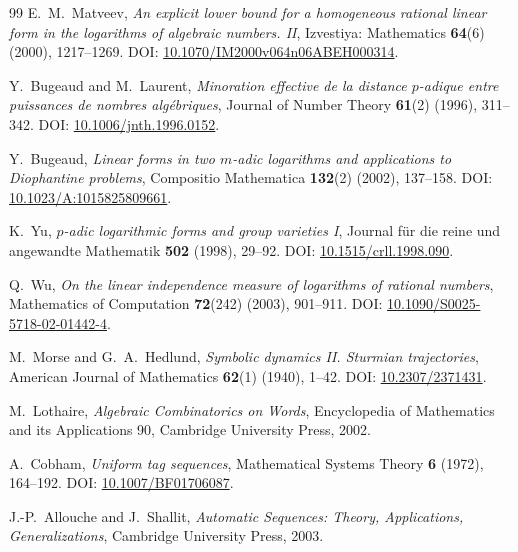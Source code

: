 \documentclass[11pt,oneside]{article}
\theoremstyle{definition}
\theoremstyle{remark}
\begin{document}
\begin{thebibliography}{99}
E.~M.~Matveev,
\newblock \emph{An explicit lower bound for a homogeneous rational linear form in the logarithms of algebraic numbers. II},
\newblock Izvestiya: Mathematics \textbf{64}(6) (2000), 1217--1269.
\newblock DOI: \href{https://doi.org/10.1070/IM2000v064n06ABEH000314}{10.1070/IM2000v064n06ABEH000314}.

Y.~Bugeaud and M.~Laurent,
\newblock \emph{Minoration effective de la distance $p$-adique entre puissances de nombres alg\'ebriques},
\newblock Journal of Number Theory \textbf{61}(2) (1996), 311--342.
\newblock DOI: \href{https://doi.org/10.1006/jnth.1996.0152}{10.1006/jnth.1996.0152}.

Y.~Bugeaud,
\newblock \emph{Linear forms in two $m$-adic logarithms and applications to Diophantine problems},
\newblock Compositio Mathematica \textbf{132}(2) (2002), 137--158.
\newblock DOI: \href{https://doi.org/10.1023/A:1015825809661}{10.1023/A:1015825809661}.

K.~Yu,
\newblock \emph{$p$-adic logarithmic forms and group varieties I},
\newblock Journal f\"ur die reine und angewandte Mathematik \textbf{502} (1998), 29--92.
\newblock DOI: \href{https://doi.org/10.1515/crll.1998.090}{10.1515/crll.1998.090}.

Q.~Wu,
\newblock \emph{On the linear independence measure of logarithms of rational numbers},
\newblock Mathematics of Computation \textbf{72}(242) (2003), 901--911.
\newblock DOI: \href{https://doi.org/10.1090/S0025-5718-02-01442-4}{10.1090/S0025-5718-02-01442-4}.

M.~Morse and G.~A.~Hedlund,
\newblock \emph{Symbolic dynamics II. Sturmian trajectories},
\newblock American Journal of Mathematics \textbf{62}(1) (1940), 1--42.
\newblock DOI: \href{https://doi.org/10.2307/2371431}{10.2307/2371431}.

M.~Lothaire,
\newblock \emph{Algebraic Combinatorics on Words},
\newblock Encyclopedia of Mathematics and its Applications 90, Cambridge University Press, 2002.

A.~Cobham,
\newblock \emph{Uniform tag sequences},
\newblock Mathematical Systems Theory \textbf{6} (1972), 164--192.
\newblock DOI: \href{https://doi.org/10.1007/BF01706087}{10.1007/BF01706087}.

J.-P.~Allouche and J.~Shallit,
\newblock \emph{Automatic Sequences: Theory, Applications, Generalizations},
\newblock Cambridge University Press, 2003.


\end{thebibliography}
\end{document}
